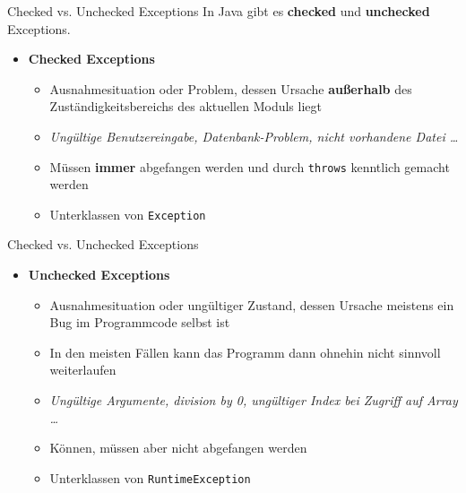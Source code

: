\documentclass[18pt]{beamer}
\begin{document}
\begin{frame}{Checked vs. Unchecked Exceptions}
    In Java gibt es \textbf{checked} und \textbf{unchecked} Exceptions.
    \vspace{.2in}
    \begin{itemize}
        \item \textbf{Checked Exceptions}
        \begin{itemize}
            \item Ausnahmesituation oder Problem, dessen Ursache \textbf{außerhalb} des Zuständigkeitsbereichs des aktuellen Moduls liegt
            \item \textit{Ungültige Benutzereingabe, Datenbank-Problem, nicht vorhandene Datei \dots}
            \item Müssen \textbf{immer} abgefangen werden und durch \texttt{throws} kenntlich gemacht werden
            \item Unterklassen von \texttt{Exception}
        \end{itemize}
    \end{itemize}

\end{frame}

\begin{frame}{Checked vs. Unchecked Exceptions}

    \begin{itemize}
        \item \textbf{Unchecked Exceptions}
        \begin{itemize}
            \item Ausnahmesituation oder ungültiger Zustand, dessen Ursache meistens ein Bug im Programmcode selbst ist
            \item In den meisten Fällen kann das Programm dann ohnehin nicht sinnvoll weiterlaufen
            \item \textit{Ungültige Argumente, division by 0, ungültiger Index bei Zugriff auf Array \dots}
            \item Können, müssen aber nicht abgefangen werden
            \item Unterklassen von \texttt{RuntimeException}
        \end{itemize}
    \end{itemize}

\end{frame}
\end{document}
